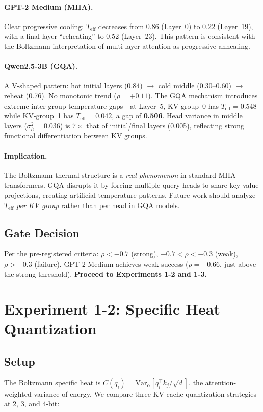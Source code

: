 \documentclass[11pt,a4paper]{article}
\begin{document}
\paragraph{GPT-2 Medium (MHA).}
Clear progressive cooling: $T_\mathrm{eff}$ decreases from 0.86 (Layer~0) to 0.22 (Layer~19), with a final-layer ``reheating'' to 0.52 (Layer~23).
This pattern is consistent with the Boltzmann interpretation of multi-layer attention as progressive annealing.

\paragraph{Qwen2.5-3B (GQA).}
A V-shaped pattern: hot initial layers (0.84) $\to$ cold middle (0.30--0.60) $\to$ reheat (0.76).
No monotonic trend ($\rho = +0.11$).
The GQA mechanism introduces extreme inter-group temperature gaps---at Layer~5, KV-group~0 has $T_\mathrm{eff}=0.548$ while KV-group~1 has $T_\mathrm{eff}=0.042$, a gap of \textbf{0.506}.
Head variance in middle layers ($\sigma^2_h = 0.036$) is $7\times$ that of initial/final layers (0.005), reflecting strong functional differentiation between KV groups.

\paragraph{Implication.}
The Boltzmann thermal structure is a \textit{real phenomenon} in standard MHA transformers.
GQA disrupts it by forcing multiple query heads to share key-value projections, creating artificial temperature patterns.
Future work should analyze $T_\mathrm{eff}$ \textit{per KV group} rather than per head in GQA models.

\subsection{Gate Decision}
Per the pre-registered criteria: $\rho < -0.7$ (strong), $-0.7 < \rho < -0.3$ (weak), $\rho > -0.3$ (failure).
GPT-2 Medium achieves \textcolor{partial}{weak success} ($\rho = -0.66$, just above the strong threshold).
\textbf{Proceed to Experiments 1-2 and 1-3.}

\section{Experiment 1-2: Specific Heat Quantization}

\subsection{Setup}
The Boltzmann specific heat is $C(q_i) = \mathrm{Var}_\alpha[q_i^\top k_j / \sqrt{d}]$, the attention-weighted variance of energy.
We compare three KV cache quantization strategies at 2, 3, and 4-bit:
\end{document}
